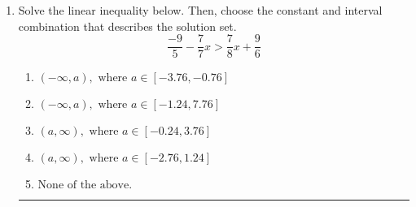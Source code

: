 \documentclass[14pt]{extbook}
\newcommand{\litem}[1]{\item#1\hspace*{-1cm}\rule{\textwidth}{0.4pt}}
\begin{document}
\begin{enumerate}
{\begin{enumerate}[label=\Alph*.]
\end{enumerate} }
\litem{
Solve the linear inequality below. Then, choose the constant and interval combination that describes the solution set.\[ \frac{-9}{5} - \frac{7}{7} x > \frac{7}{8} x + \frac{9}{6} \]\begin{enumerate}[label=\Alph*.]
\item \( (-\infty, a), \text{ where } a \in [-3.76, -0.76] \)
\item \( (-\infty, a), \text{ where } a \in [-1.24, 7.76] \)
\item \( (a, \infty), \text{ where } a \in [-0.24, 3.76] \)
\item \( (a, \infty), \text{ where } a \in [-2.76, 1.24] \)
\item \( \text{None of the above}. \)

\end{enumerate} }
\end{enumerate}
\end{document}
